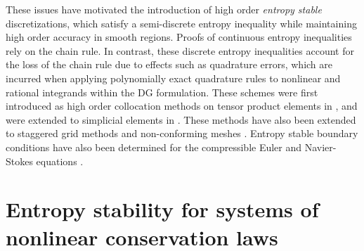 \documentclass[review]{siamart0216}
\theoremstyle{assumption}
\begin{document}
These issues have motivated the introduction of high order \textit{entropy stable} discretizations, which satisfy a semi-discrete entropy inequality while maintaining high order accuracy in smooth regions.  Proofs of continuous entropy inequalities rely on the chain rule.  In contrast, these discrete entropy inequalities account for the loss of the chain rule due to effects such as quadrature errors, which are incurred when applying polynomially exact quadrature rules to nonlinear and rational integrands within the DG formulation.  These schemes were first introduced as high order collocation methods on tensor product elements in \cite{fisher2013high, carpenter2014entropy, gassner2016split, gassner2017br1}, and were extended to simplicial elements in \cite{crean2017high, chen2017entropy, crean2018entropy, chan2017discretely}.  These methods have also been extended to staggered grid methods \cite{parsani2016entropy} and non-conforming meshes \cite{friedrich2017entropy}.  Entropy stable boundary conditions have also been determined for the compressible Euler and Navier-Stokes equations \cite{parsani2015entropy, svard2018entropy}.  

\section{Entropy stability for systems of nonlinear conservation laws}
\end{document}
